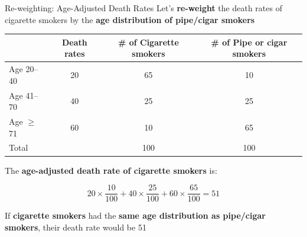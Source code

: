 \documentclass[
  ignorenonframetext,
  aspectratio=169, handout]{beamer}
\begin{document}
\begin{frame}{Re-weighting: Age-Adjusted Death Rates}
\protect\hypertarget{re-weighting-age-adjusted-death-rates}{}
Let's \textbf{re-weight} the death rates of cigarette smokers by the
\textbf{age distribution of pipe/cigar smokers}

\begin{center}
\begin{tabular}{lccc}
\hline
                & Death rates & \# of Cigarette smokers & \# of Pipe or cigar smokers \\ \hline
Age 20–40       & \cellcolor{green!25}20          & 65                       & \cellcolor{green!25}10                          \\
Age 41–70       & \cellcolor{green!25}40          & 25                       & \cellcolor{green!25}25                          \\
Age $\geq$ 71   & \cellcolor{green!25}60          & 10                       & \cellcolor{green!25}65                          \\
Total           &             & 100                      & 100                         \\ \hline
\end{tabular}
\end{center}

The \textbf{age-adjusted death rate of cigarette smokers} is:

\[20 \times \dfrac{10}{100} + 40 \times \dfrac{25}{100} + 60 \times \dfrac{65}{100}=51\]

\vfill

If \textbf{cigarette smokers} had the \textbf{same age distribution as
pipe/cigar smokers}, their death rate would be 51
\end{frame}
\end{document}
